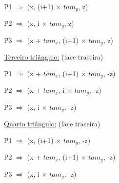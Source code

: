 \documentclass[a4paper]{article}
\begin{document}
\begin{enumerate}
\begin{enumerate}
\begin{enumerate}
      \vspace{0.5cm}

          \hspace{0.5cm} P1 $\Rightarrow$ (x, (i+1) $\times$ $tam_{y}$, z)

      \vspace{0.2cm}

          \hspace{0.5cm} P2 $\Rightarrow$ (x, i $\times$ $tam_{y}$, z)

      \vspace{0.2cm}

          \hspace{0.5cm} P3 $\Rightarrow$ (x + $tam_{x}$, (i+1) $\times$ $tam_{y}$, z)

      \vspace{0.5cm}

      \underline{Terceiro triângulo:} (face traseira)

      \vspace{0.5cm}

          \hspace{0.5cm} P1 $\Rightarrow$ (x + $tam_{x}$, (i+1) $\times$ $tam_{y}$, -z)

      \vspace{0.2cm}

          \hspace{0.5cm} P2 $\Rightarrow$ (x + $tam_{x}$, i $\times$ $tam_{y}$, -z)

      \vspace{0.2cm}

          \hspace{0.5cm} P3 $\Rightarrow$ (x, i $\times$ $tam_{y}$, -z)

      \vspace{0.5cm}

      \underline{Quarto triângulo:} (face traseira)

      \vspace{0.5cm}

          \hspace{0.5cm} P1 $\Rightarrow$ (x, (i+1) $\times$ $tam_{y}$, -z)

      \vspace{0.2cm}

          \hspace{0.5cm} P2 $\Rightarrow$ (x + $tam_{x}$, (i+1) $\times$ $tam_{y}$, -z)

      \vspace{0.2cm}

          \hspace{0.5cm} P3 $\Rightarrow$ (x, i $\times$ $tam_{y}$, -z)


\end{enumerate}
\end{enumerate}
\end{enumerate}
\end{document}
